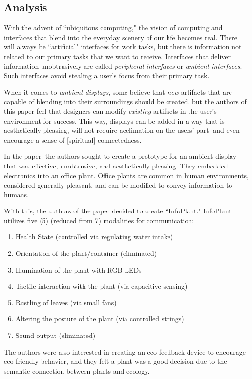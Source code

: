 \documentclass{article}
\begin{document}
\subsection{Analysis}
With the advent of ``ubiquitous computing," the vision of computing and interfaces that blend into the everyday scenery of our life becomes real. There will always be ``artificial" interfaces for work tasks, but there is information not related to our primary tasks that we want to receive. Interfaces that deliver information unobtrusively are called \emph{peripheral interfaces} or \emph{ambient interfaces}. Such interfaces avoid stealing a user's focus from their primary task.

When it comes to \emph{ambient displays}, some believe that \emph{new} artifacts that are capable of blending into their surroundings should be created, but the authors of this paper feel that designers can modify \emph{existing} artifacts in the user's environment for success. This way, displays can be added in a way that is aesthetically pleasing, will not require acclimation on the users' part, and even encourage a sense of [spiritual] connectedness.

In the paper, the authors sought to create a prototype for an ambient display that was effective, unobtrusive, and aesthetically pleasing. They embedded electronics into an office plant. Office plants are common in human environments, considered generally pleasant, and can be modified to convey information to humans.

With this, the authors of the paper decided to create ``InfoPlant." InfoPlant utilizes five (5) (reduced from 7) modalities for communication:
\begin{enumerate}
\item Health State (controlled via regulating water intake)
\item Orientation of the plant/container (eliminated)
\item Illumination of the plant with RGB LEDs
\item Tactile interaction with the plant (via capacitive sensing)
\item Rustling of leaves (via small fans)
\item Altering the posture of the plant (via controlled strings)
\item Sound output (eliminated)
\end{enumerate}

The authors were also interested in creating an eco-feedback device to encourage eco-friendly behavior, and they felt a plant was a good decision due to the semantic connection between plants and ecology.
\end{document}
